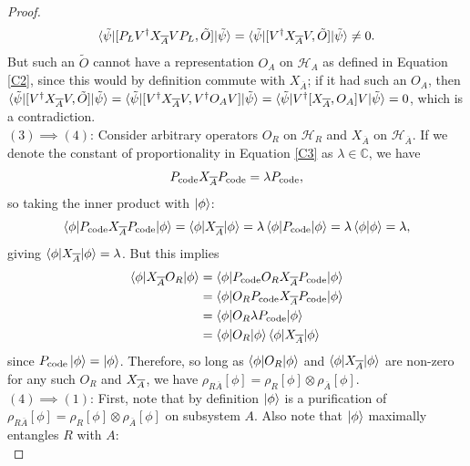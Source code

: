 \documentclass[12pt,a4paper]{report}
\numberwithin{equation}{section}
\newcommand{\Pc}{P_{\text{code}}}
\newcommand{\ol}[1]{\overline{#1}}
\theoremstyle{definition}
\theoremstyle{theorem}
\theoremstyle{theorem}
\theoremstyle{example}
\theoremstyle{definition}
\begin{document}
\begin{proof}
	\begin{equation}
		\braket{\tilde{\psi}|[P_{L}V^{\dagger} X_{\ol{A}}VP_{L},\tilde{O}]|\tilde{\psi}}=\braket{\tilde{\psi}|[V^{\dagger}X_{\ol{A}}V,\tilde{O}]|\tilde{\psi}}\neq 0.
	\end{equation}
	But such an $\tilde{O}$ cannot have a representation $O_{A}$ on $\mathcal{H}_{A}$ as defined in Equation \ref{C2}, since this would by definition commute with $X_{\ol{A}}$; if it had such an $O_{A}$, then $\braket{\tilde{\psi}|[V^{\dagger}X_{\ol{A}}V,\tilde{O}]|\tilde{\psi}}=\braket{\tilde{\psi}|[V^{\dagger}X_{\ol{A}}V,V^{\dagger}O_{A}V]|\tilde{\psi}}=\braket{\tilde{\psi}|V^{\dagger}[X_{\ol{A}},O_{A}]V|\tilde{\psi}}=0$, which is a contradiction.\\
	$(3)\implies (4)$: Consider arbitrary operators $O_{R}$ on $\mathcal{H}_{R}$ and $X_{\overline{A}}$ on $\mathcal{H}_{\overline{A}}$. If we denote the constant of proportionality in Equation \ref{C3} as $\lambda\in\mathbb{C}$, we have
	\begin{equation}
		\Pc\Xabar\Pc=\lambda\Pc,
	\end{equation}
	so taking the inner product with $\ket{\phi}$:
	\begin{equation}
		\braket{\phi|\Pc\Xabar\Pc|\phi}=\braket{\phi|\Xabar|\phi}=\lambda\braket{\phi|\Pc|\phi}=\lambda\braket{\phi|\phi}=\lambda,
	\end{equation}
	giving $\braket{\phi|X_{\overline{A}}|\phi}=\lambda$. But this implies
	\begin{equation}
		\begin{aligned}
			\braket{\phi|\Xabar O_{R}|\phi}&=\braket{\phi|\Pc O_{R}\Xabar\Pc|\phi}\\&=\braket{\phi|O_{R}\Pc\Xabar\Pc|\phi}\\&=\braket{\phi|O_{R}\lambda\Pc|\phi}\\&=\braket{\phi|O_{R}|\phi}\braket{\phi|\Xabar|\phi}
		\end{aligned}
	\end{equation} 
	since $\Pc\ket{\phi}=\ket{\phi}$. Therefore, so long as $\braket{\phi|O_{R}|\phi}$ and $\braket{\phi|X_{\overline{A}}|\phi}$ are non-zero for any such $O_{R}$ and $X_{\overline{A}}$, we have $\rho_{R\overline{A}}[\phi]=\rho_{R}[\phi]\otimes\rho_{\overline{A}}[\phi]$.\\
	$(4)\implies (1)$: First, note that by definition $\ket{\phi}$ is a purification of $\rho_{R\overline{A}}[\phi]=\rho_{R}[\phi]\otimes\rho_{\overline{A}}[\phi]$ on subsystem $A$. Also note that $\ket{\phi}$ maximally entangles $R$ with $A$:
	\begin{equation}

\end{equation}
\end{proof}
\end{document}
